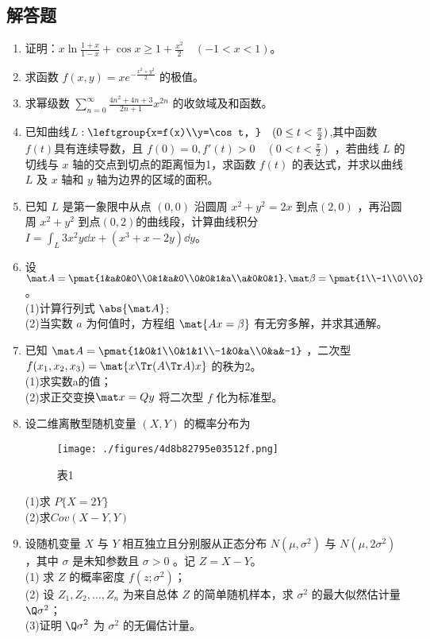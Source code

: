 \subsection{解答题}
\begin{enumerate}
\item 证明：$\displaystyle x\ln \frac{1+x}{1-x}+\cos x\ge 1+\frac{x^2}{2} \quad (-1<x<1)$。
\item  求函数 $\displaystyle f(x,y)=xe^{-\frac{x^2+y^2}{2}}$  的极值。
\item  求幂级数 $\displaystyle \sum_{n=0}^\infty \frac{4n^2+4n+3}{2n+1}x^{2n}$ 的收敛域及和函数。
\item 已知曲线$L:\leftgroup{x=f(x)\\y=\cos t, }\quad (0 \le t<\frac{\pi}{2} )$,其中函数 $f(t)$具有连续导数，且 $f(0)=0,f'(t)>0 \quad (0<t<\frac{\pi}{2})$  ，若曲线 $L$ 的切线与 $x$ 轴的交点到切点的距离恒为1，求函数 $f(t)$ 的表达式，并求以曲线 $L$  及 $x$ 轴和 $y$ 轴为边界的区域的面积。
\item  已知 $L$ 是第一象限中从点 $(0,0)$ 沿圆周 $x^2+y^2=2x$ 到点$ (2,0)$ ，再沿圆周 $x^2+y^2$ 到点$ (0,2)$的曲线段，计算曲线积分  $\displaystyle I=\int_L 3x^2y\dd{x+(x^3+x-2y)}\dd{y}$。
\item 设 $\mat A=\pmat{1&a&0&0\\0&1&a&0\\0&0&1&a\\a&0&0&1},\mat \beta =\pmat{1\\-1\\0\\0}$。\\
(1)计算行列式 $\abs{\mat A }$;\\
(2)当实数 $a$ 为何值时，方程组 $\mat{ Ax=\beta}$ 有无穷多解，并求其通解。
\item  已知 $\mat A=\pmat{1&0&1\\0&1&1\\-1&0&a\\0&a&-1}$  ，二次型  $f(x_1,x_2,x_3)=\mat{x \Tr(A \Tr A)x}$ 的秩为$2$。\\
(1)求实数a的值；\\
(2)求正交变换$\mat x=Qy$ 将二次型 $f$ 化为标准型。
\item 设二维离散型随机变量 $(X,Y)$ 的概率分布为
\begin{figure}[ht]
\centering
\texttt{[image: ./figures/4d8b82795e03512f.png]}
\caption{表1} \label{fig_PeeM12_1}
\end{figure}
(1)求 $P\{X=2Y\}$\\
(2)求$Cov (X-Y,Y)$
\item 设随机变量 $X$ 与 $Y$ 相互独立且分别服从正态分布 $N(\mu,\sigma^2)$ 与 $N(\mu,2\sigma ^2)$ ，其中 $\sigma$ 是未知参数且 $\sigma>0$ 。记 $Z=X-Y$。\\
(1) 求 $Z$ 的概率密度 $f(z;\sigma^2)$；\\
(2)  设 $Z_1,Z_2,\dots,Z_n$ 为来自总体 $Z$ 的简单随机样本，求 $\sigma^2$ 的最大似然估计量 $\Q \sigma^2$；\\
(3)证明 $\displaystyle \Q \sigma^2$  为 $\sigma^2$  的无偏估计量。
\end{enumerate}

